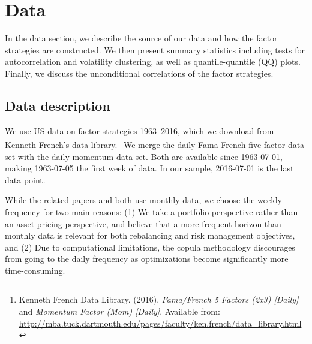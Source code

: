 \section{Data}
\label{sec:data}
In the data section, we describe the source of our data and how the factor strategies are constructed. We then present summary statistics including tests for autocorrelation and volatility clustering, as well as quantile-quantile (QQ) plots. Finally, we discuss the unconditional correlations of the factor strategies.

\subsection{Data description}

We use US data on factor strategies 1963--2016, which we download from Kenneth French's data library.\footnote{Kenneth French Data Library. (2016). \textit{Fama/French 5 Factors (2x3) [Daily]} and \textit{Momentum Factor (Mom) [Daily]}. Available from: \url{http://mba.tuck.dartmouth.edu/pages/faculty/ken.french/data_library.html}} We merge the daily Fama-French five-factor data set with the daily momentum data set. Both are available since 1963-07-01, making 1963-07-05 the first week of data. In our sample, 2016-07-01 is the last data point. 

While the related papers \textcite{FF2015} and \textcite{Asness2015} both use monthly data, we choose the weekly frequency for two main reasons: (1) We take a portfolio perspective rather than an asset pricing perspective, and believe that a more frequent horizon than monthly data is relevant for both rebalancing and risk management objectives, and (2) Due to computational limitations, the copula methodology discourages from going to the daily frequency as optimizations become significantly more time-consuming.

